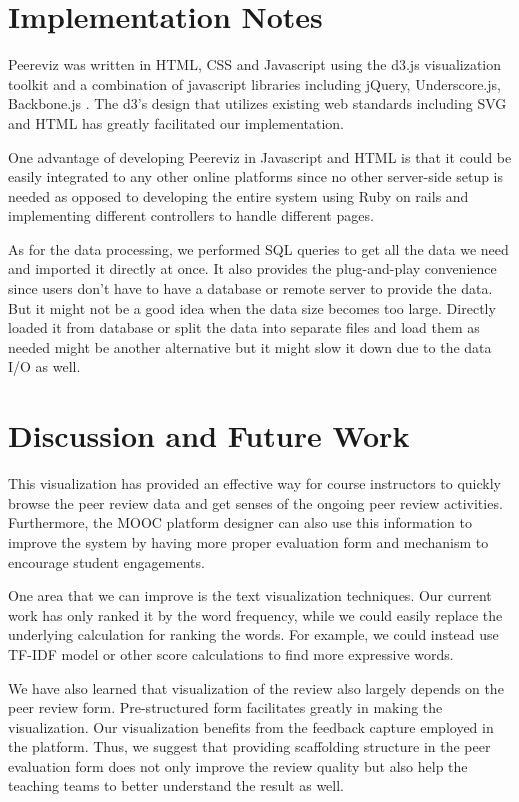 \documentclass{sigchi}
\begin{document}
\section{Implementation Notes} Peereviz was written in HTML, CSS and
Javascript using the d3.js visualization toolkit \cite{d3} and a combination
of javascript libraries including jQuery, Underscore.js, Backbone.js
\cite{jquery,underscore,backbone}.  The d3’s design that utilizes existing web
standards including SVG and HTML has greatly facilitated our implementation.

One advantage of developing Peereviz in Javascript and HTML is that it could
be easily integrated to any other online platforms since no other server-side
setup is needed as opposed to developing the entire system using Ruby on rails
and implementing different controllers to handle different pages.

As for the data processing, we performed SQL queries to get all the data we
need and imported it directly at once. It also provides the plug-and-play
convenience since users don't have to have a database or remote server to
provide the data. But it might not be a good idea when the data size becomes
too large. Directly loaded it from database or split the data into separate
files and load them as needed might be another alternative but it might slow
it down due to the data I/O as well.

\section{Discussion and Future Work}

This visualization has provided an effective way for course instructors to
quickly browse the peer review data and get senses of the ongoing peer review
activities.  Furthermore, the MOOC platform designer can also use this
information to improve the system by having more proper evaluation form and
mechanism to encourage student engagements.

One area that we can improve is the text visualization techniques. Our current
work has only ranked it by the word frequency, while we could easily replace the
underlying calculation for ranking the words. For example, we could instead use
TF-IDF model \cite{manning2008} or other score calculations to find more
expressive words.

We have also learned that visualization of the review also largely depends on
the peer review form.  Pre-structured form facilitates greatly in making the
visualization.  Our visualization benefits from the feedback capture employed in
the platform.  Thus, we suggest that providing scaffolding structure in the peer
evaluation form does not only improve the review quality but also help the
teaching teams to better understand the result as well.
\end{document}
